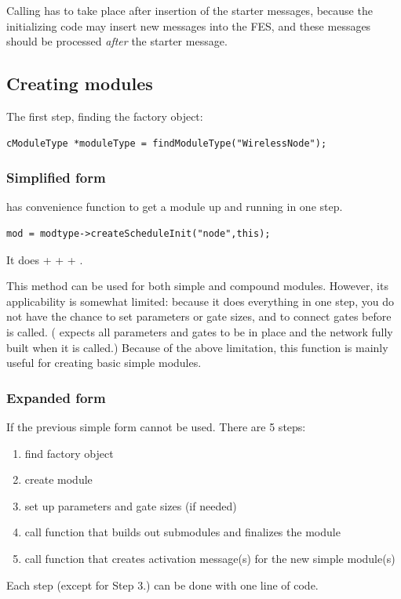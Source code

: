 Calling  has to take place after insertion of the
starter messages, because the initializing code may insert new messages
into the FES, and these messages should be processed
\textit{after} the starter message.

%
%


\subsection{Creating modules}

The first step, finding the factory object:

\begin{verbatim}
cModuleType *moduleType = findModuleType("WirelessNode");
\end{verbatim}


\subsubsection{Simplified form}

 has
 convenience function to get a module up and
running in one step.

\begin{verbatim}
mod = modtype->createScheduleInit("node",this);
\end{verbatim}

It does  +  +
 + .

This method can be used for both simple and compound modules.
However, its applicability is somewhat limited:
because it does everything in one step,
you do not have the chance to set parameters or gate sizes,
and to connect gates before  is called.
( expects all parameters and gates to
be in place and the network fully built when it is called.)
Because of the above limitation, this function is mainly useful
for creating basic simple modules.

%
%

\subsubsection{Expanded form}


If the previous simple form cannot be used. There are 5 steps:
\begin{enumerate}
  \item{find factory object}
  \item{create module}
  \item{set up parameters and gate sizes (if needed)}
  \item{call function that builds out submodules and finalizes the
    module}
  \item{call function that creates activation message(s) for the new
    simple module(s)}
\end{enumerate}
Each step (except for Step 3.) can be done with one line of code.



